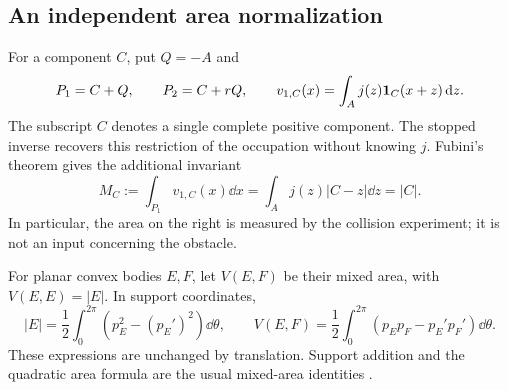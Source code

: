 \subsection{An independent area normalization}
For a component $C$, put $Q=-A$ and
\[
 P_1=C+Q,\qquad P_2=C+rQ,
 \qquad v_{1,C}(x)=\int_Aj(z)\mathbf 1_C(x+z)\,\mathrm d z.
\]
The subscript $C$ denotes a single complete positive component. The
stopped inverse recovers this restriction of the occupation without
knowing $j$. Fubini's theorem gives the additional invariant
\begin{equation}\label{eq:unk-scale-mass}
 M_C:=\int_{P_1}v_{1,C}(x)\dd x
     =\int_Aj(z)|C-z|\dd z=|C|.
\end{equation}
In particular, the area on the right is measured by the collision
experiment; it is not an input concerning the obstacle.

For planar convex bodies $E,F$, let $V(E,F)$ be their mixed area,
with $V(E,E)=|E|$. In support coordinates,
\begin{equation}\label{eq:unk-scale-mixed-area}
 |E|=\frac12\int_0^{2\pi}(p_E^2-(p_E')^2)\dd\theta,
 \qquad
 V(E,F)=\frac12\int_0^{2\pi}(p_Ep_F-p_E'p_F')\dd\theta.
\end{equation}
These expressions are unchanged by translation. Support addition and
the quadratic area formula are the usual mixed-area identities
\cite{Schneider}.

